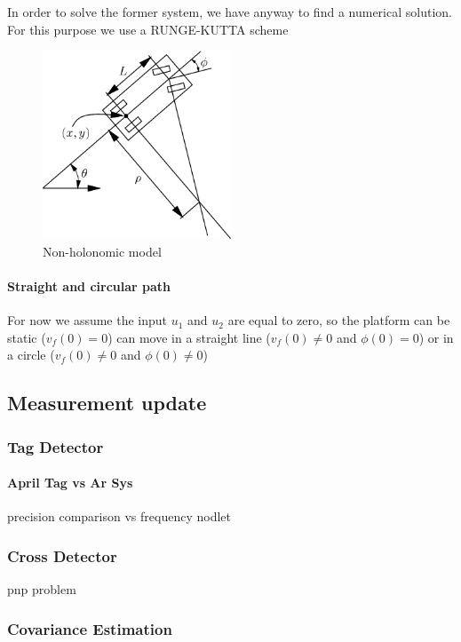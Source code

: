 In order to solve the former system, we have anyway to find a numerical solution. For this purpose we use a    
RUNGE-KUTTA scheme %
\begin{figure}[!ht]
    \centering
    \includegraphics[width=0.5\textwidth]{img/non_holonomic_model.png}
    \caption{Non-holonomic model}
    \label{fig:nonholonomicmodel}
\end{figure}
\paragraph{Straight and circular path}
For now we assume the input $u_1$ and $u_2$  are equal to zero, so the platform can be static ($v_f(0) = 0$) can move in a straight line ($v_f(0) \neq 0$ and $\phi(0) = 0$) or in a circle ($v_f(0) \neq 0$ and $\phi(0) \neq 0$)


\subsection{Measurement update}
\subsubsection{Tag Detector}

\paragraph{April Tag vs Ar Sys}
precision comparison vs frequency
nodlet
\subsubsection{Cross Detector}
pnp problem
\subsubsection{Covariance Estimation}




